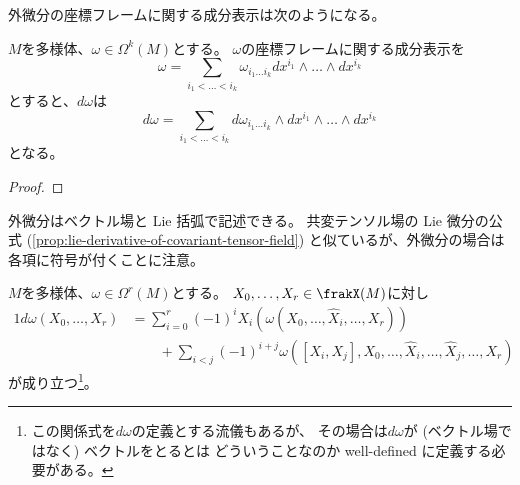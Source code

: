 \documentclass[report]{jlreq}
\begin{document}
外微分の座標フレームに関する成分表示は次のようになる。

\begin{proposition}[外微分の座標フレームに関する成分表示]
    $M$を多様体、$\omega \in \Omega^k(M)$とする。
    $\omega$の座標フレームに関する成分表示を
    \begin{equation}
        \omega = \sum_{i_1 < \dots < i_k}
            \omega_{i_1 \dots i_k} dx^{i_1} \wedge \dots \wedge dx^{i_k}
    \end{equation}
    とすると、$d\omega$は
    \begin{equation}
        d\omega = \sum_{i_1 < \dots < i_k}
            d\omega_{i_1 \dots i_k} \wedge dx^{i_1} \wedge \dots \wedge dx^{i_k}
    \end{equation}
    となる。
\end{proposition}

\begin{proof}
    \TODO{}
\end{proof}

外微分はベクトル場と Lie 括弧で記述できる。
共変テンソル場の Lie 微分の公式
(\cref{prop:lie-derivative-of-covariant-tensor-field})
と似ているが、外微分の場合は各項に符号が付くことに注意。

\begin{proposition}[外微分とベクトル場の計算公式]
    $M$を多様体、$\omega \in \Omega^r(M)$とする。
    $X_0, \dots, X_r \in \frakX(M)$に対し
    \begin{alignat}{1}
        d\omega(X_0, \dots, X_r)
            &= \sum_{i = 0}^r (-1)^i X_i (\omega(X_0, \dots, \hat{X}_i, \dots, X_r)) \\
            &\qquad + \sum_{i < j} (-1)^{i+j}
                \omega([X_i, X_j], X_0, \dots, \hat{X}_i, \dots, \hat{X}_j, \dots, X_r)
    \end{alignat}
    が成り立つ\footnote{
        この関係式を$d\omega$の定義とする流儀もあるが、
        その場合は$d\omega$が (ベクトル場ではなく) ベクトルをとるとは
        どういうことなのか well-defined に定義する必要がある。
    }。
\end{proposition}

\end{document}
